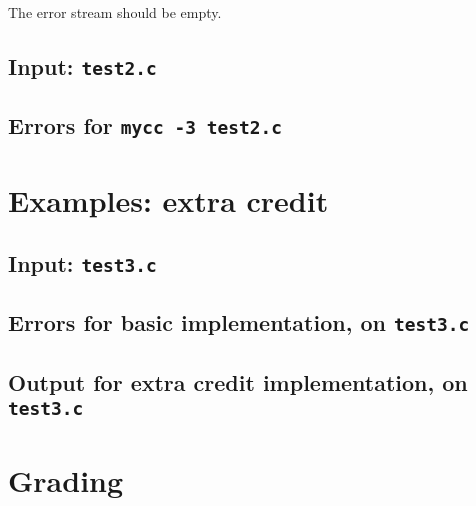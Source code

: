 \documentclass{article}
\newcommand{\thispart}{3}
\begin{document}
The error stream should be empty.

\subsection{Input: {\tt test2.c}}



\subsection{Errors for {\tt mycc -\thispart{} test2.c}}



\section{Examples: extra credit} \label{SEC:exmax}

\subsection{Input: {\tt test3.c}}



\subsection{Errors for basic implementation, on {\tt test3.c}}



\subsection{Output for extra credit implementation, on {\tt test3.c}}



\section{Grading}
\end{document}
